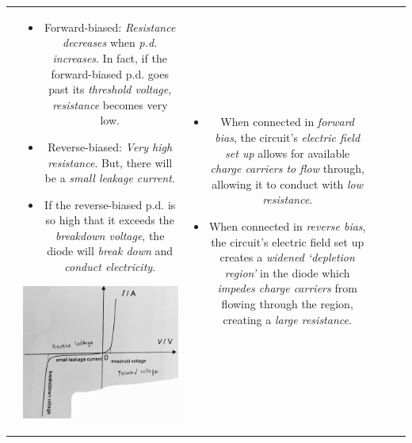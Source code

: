 \documentclass[oneside]{book}
\begin{document}
\begin{itemize}
\begin{longtable}{|Sc|Sc|Sc|}
\begin{minipage}{0.25\textwidth}
\begin{center}
            \end{center}
        \end{minipage} &
        \begin{minipage}{0.3\textwidth}
            \begin{itemize}
                    \item Forward-biased: \emph{Resistance decreases} when \emph{p.d. increases}. In fact, if the forward-biased p.d. goes past its \emph{threshold voltage}, \emph{resistance} becomes very low.
                    \item Reverse-biased: \emph{Very high resistance}. But, there will be a \emph{small leakage current}.
                    \item If the reverse-biased p.d. is so high that it exceeds the \emph{breakdown voltage}, the diode will \emph{break down} and \emph{conduct electricity}.
            \end{itemize} 
            \includegraphics[width=\textwidth]{../images/Diode I-V characteristics.jpg}
        \end{minipage} &
        \begin{minipage}{0.3\textwidth}
            \begin{itemize}
                \item When connected in \emph{forward bias}, the circuit's \emph{electric field set up} allows for available \emph{charge carriers to flow} through, allowing it to conduct with \emph{low resistance}.
                \item When connected in \emph{reverse bias}, the circuit's electric field set up creates a \emph{widened `depletion region'} in the diode which \emph{impedes charge carriers} from flowing through the region, creating a \emph{large resistance}. 

\end{itemize}
\end{minipage}
\end{longtable}
\end{itemize}
\end{document}

